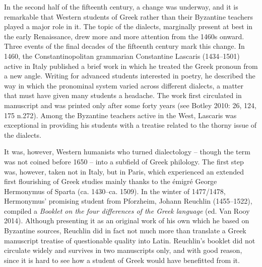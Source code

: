 \documentclass[12pt]{article}
\newenvironment{styleStandard}{\renewcommand\baselinestretch{1.25}\setlength\leftskip{0in}\setlength\rightskip{0in}\setlength\parindent{0.1972in}\setlength\parfillskip{0pt plus 1fil}\setlength\parskip{0in plus 1pt}\writerlistparindent\writerlistleftskip\leavevmode\normalfont\normalsize\writerlistlabel\ignorespaces}{\unskip\vspace{0in plus 1pt}\par}
\newcommand\writerlistleftskip{}
\newcommand\writerlistparindent{}
\newcommand\writerlistlabel{}
\begin{document}
\begin{styleStandard}
\end{styleStandard}

\begin{styleStandard}
In the second half of the fifteenth century, a change was underway, and it is remarkable that Western students of Greek rather than their Byzantine teachers played a major role in it. The topic of the dialects, marginally present at best in the early Renaissance, drew more and more attention from the 1460s onward. Three events of the final decades of the fifteenth century mark this change. In 1460, the Constantinopolitan grammarian Constantine Lascaris (1434–1501) active in Italy published a brief work in which he treated the Greek pronoun from a new angle. Writing for advanced students interested in poetry, he described the way in which the pronominal system varied across different dialects, a matter that must have given many students a headache. The work first circulated in manuscript and was printed only after some forty years (see Botley 2010: 26, 124, 175 n.272). Among the Byzantine teachers active in the West, Lascaris was exceptional in providing his students with a treatise related to the thorny issue of the dialects.
\end{styleStandard}

\begin{styleStandard}
It was, however, Western humanists who turned dialectology – though the term was not coined before 1650 – into a subfield of Greek philology. The first step was, however, taken not in Italy, but in Paris, which experienced an extended first flourishing of Greek studies mainly thanks to the émigré George Hermonymus of Sparta (ca. 1430–ca. 1509). In the winter of 1477/1478, Hermonymus’ promising student from Pforzheim, Johann Reuchlin (1455–1522), compiled a \textit{Booklet on the four differences of the Greek language} (ed. Van Rooy 2014). Although presenting it as an original work of his own which he based on Byzantine sources, Reuchlin did in fact not much more than translate a Greek manuscript treatise of questionable quality into Latin. Reuchlin’s booklet did not circulate widely and survives in two manuscripts only, and with good reason, since it is hard to see how a student of Greek would have benefitted from it.
\end{styleStandard}
\end{document}
